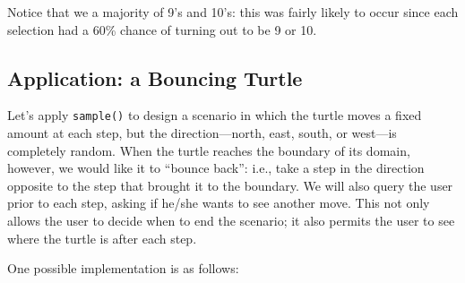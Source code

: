 \documentclass[]{book}
\theoremstyle{definition}
\theoremstyle{definition}
\theoremstyle{remark}
\begin{document}
{Notice that we a majority of 9's and 10's: this was fairly likely to
occur since each selection had a 60\% chance of turning out to be 9 or
10.

\subsection{Application: a Bouncing
Turtle}\label{application-a-bouncing-turtle}

Let's apply \texttt{sample()} to design a scenario in which the turtle
moves a fixed amount at each step, but the direction---north, east,
south, or west---is completely random. When the turtle reaches the
boundary of its domain, however, we would like it to ``bounce back'':
i.e., take a step in the direction opposite to the step that brought it
to the boundary. We will also query the user prior to each step, asking
if he/she wants to see another move. This not only allows the user to
decide when to end the scenario; it also permits the user to see where
the turtle is after each step.

One possible implementation is as follows:

}
\end{document}
